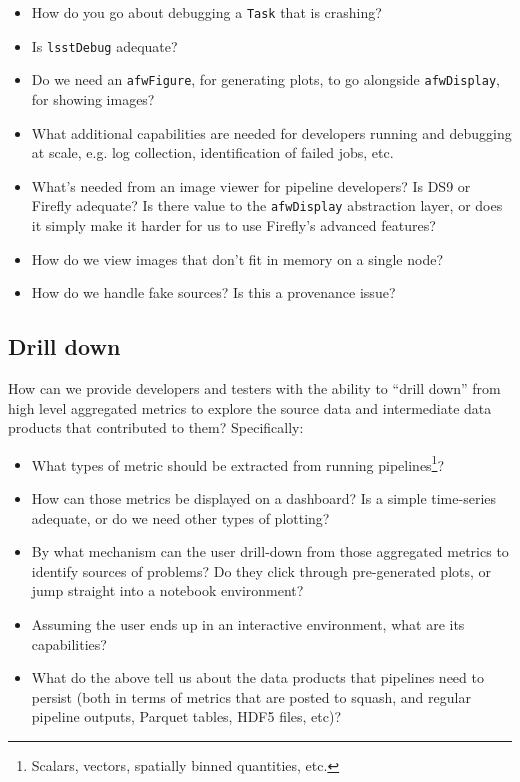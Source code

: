 \begin{itemize}

  \item{How do you go about debugging a \texttt{Task} that is crashing?}
  \item{Is \texttt{lsstDebug} adequate?}
  \item{Do we need an \texttt{afwFigure}, for generating plots, to go alongside \texttt{afwDisplay}, for showing images?}
  \item{What additional capabilities are needed for developers running and debugging at scale, e.g. log collection, identification of failed jobs, etc.}
  \item{What's needed from an image viewer for pipeline developers? Is DS9 or Firefly adequate? Is there value to the \texttt{afwDisplay} abstraction layer, or does it simply make it harder for us to use Firefly's advanced features?}
  \item{How do we view images that don't fit in memory on a single node?}
  \item{How do we handle fake sources? Is this a provenance issue?}

\end{itemize}

\subsection{Drill down}
\label{sec:approach:drill}

How can we provide developers and testers with the ability to ``drill down''
from high level aggregated metrics to explore the source data and intermediate
data products that contributed to them? Specifically:

\begin{itemize}

  \item{What types of metric should be extracted from running pipelines\footnote{Scalars, vectors, spatially binned quantities, etc.}?}
  \item{How can those metrics be displayed on a dashboard? Is a simple time-series adequate, or do we need other types of plotting?}
  \item{By what mechanism can the user drill-down from those aggregated metrics to identify sources of problems? Do they click through pre-generated plots, or jump straight into a notebook environment?}
  \item{Assuming the user ends up in an interactive environment, what are its capabilities?}
  \item{What do the above tell us about the data products that pipelines need to persist (both in terms of metrics that are posted to \gls{squash}, and regular pipeline outputs, Parquet tables, HDF5 files, etc)?}

\end{itemize}

